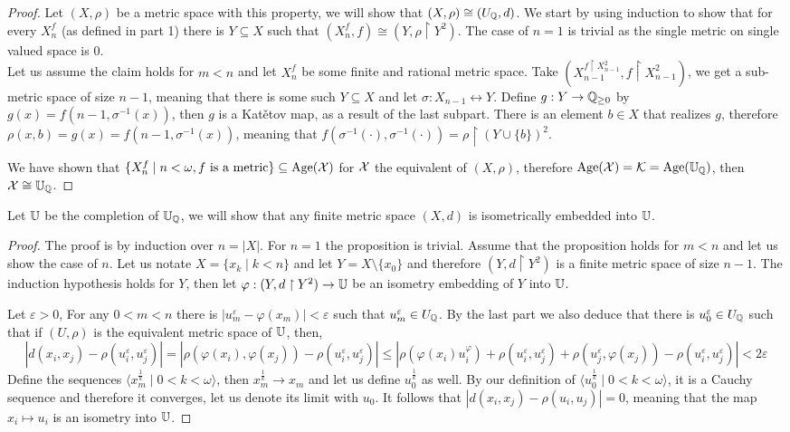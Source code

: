 \begin{proof}
	Let $(X, \rho)$ be a metric space with this property, we will show that $(X, \rho) \cong (U_{\mathbb{Q}}, d)$.
	We start by using induction to show that for every $X_n^f$ (as defined in part 1) there is $Y \subseteq X$ such that $(X_n^f, f) \cong (Y, \rho \restriction Y^2)$.
	The case of $n = 1$ is trivial as the single metric on single valued space is $0$. \\
	Let us assume the claim holds for $m < n$ and let $X_n^f$ be some finite and rational metric space.
	Take $(X_{n - 1}^{f \restriction X_{n - 1}^2}, f \restriction X_{n - 1}^2)$, we get a sub-metric space of size $n - 1$, meaning that there is some such $Y \subseteq X$ and let $\sigma : X_{n - 1} \leftrightarrow Y$.
	Define $g : Y \to \mathbb{Q}_{\ge 0}$ by $g(x) = f(n - 1, \sigma^{-1}(x))$, then $g$ is a Katětov map, as a result of the last subpart.
	There is an element $b \in X$ that realizes $g$, therefore $\rho(x, b) = g(x) = f(n - 1, \sigma^{-1}(x))$, meaning that $f(\sigma^{-1}(\cdot), \sigma^{-1}(\cdot)) = \rho \restriction {(Y \cup \{ b \})}^2$.

	We have shown that $\{ X_n^f \mid n < \omega, f \text{ is a metric} \} \subseteq \operatorname{Age}(\mathcal{X})$ for $\mathcal{X}$ the equivalent of $(X, \rho)$, therefore $\operatorname{Age}(\mathcal{X}) = \mathcal{K} = \operatorname{Age}(\mathbb{U}_{\mathbb{Q}})$, then $\mathcal{X} \cong \mathbb{U}_{\mathbb{Q}}$.
\end{proof}

\subquestion{}
Let $\mathbb{U}$ be the completion of $\mathbb{U}_{\mathbb{Q}}$,
we will show that any finite metric space $(X, d)$ is isometrically embedded into $\mathbb{U}$.
\begin{proof}
	The proof is by induction over $n = |X|$.
	For $n = 1$ the proposition is trivial.
	Assume that the proposition holds for $m < n$ and let us show the case of $n$.
	Let us notate $X = \{ x_k \mid k < n \}$ and let $Y = X \setminus \{ x_0 \}$ and therefore $(Y, d \restriction Y^2)$ is a finite metric space of size $n - 1$.
	The induction hypothesis holds for $Y$, then let $\varphi : (Y, d \restriction Y^2) \to \mathbb{U}$ be an isometry embedding of $Y$ into $\mathbb{U}$.

	Let $\varepsilon > 0$, For any $0 < m < n$ there is $|u_m^\varepsilon - \varphi(x_m)| < \varepsilon$ such that $u_m^\varepsilon \in U_{\mathbb{Q}}$.
	By the last part we also deduce that there is $u_0^\varepsilon \in U_{\mathbb{Q}}$ such that if $(U, \rho)$ is the equivalent metric space of $\mathbb{U}$,
	then,
	\[
		|d(x_i, x_j) - \rho(u_i^\varepsilon, u_j^\varepsilon)|
		= |\rho(\varphi(x_i), \varphi(x_j)) - \rho(u_i^\varepsilon, u_j^\varepsilon)|
		\le |\rho(\varphi(x_i) u_i^\varphi) + \rho(u_i^\varepsilon, u_j^\varepsilon) + \rho(u_j^\varepsilon, \varphi(x_j)) - \rho(u_i^\varepsilon, u_j^\varepsilon)|
		< 2 \varepsilon
	\]
	Define the sequences $\langle x_m^{\frac{1}{k}} \mid 0 < k < \omega \rangle$, then $x_m^{\frac{1}{k}} \to x_m$ and let us define $u_0^{\frac{1}{k}}$ as well.
	By our definition of $\langle u_0^{\frac{1}{k}} \mid 0 < k < \omega \rangle$, it is a Cauchy sequence and therefore it converges, let us denote its limit with $u_0$.
	It follows that $|d(x_i, x_j) - \rho(u_i, u_j)| = 0$, meaning that the map $x_i \mapsto u_i$ is an isometry into $\mathbb{U}$.
\end{proof}

